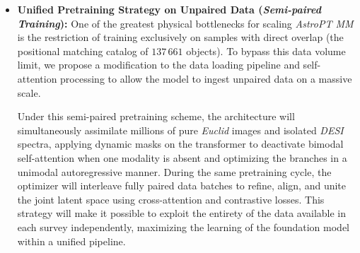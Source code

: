 \begin{itemize}
	\item \textbf{Unified Pretraining Strategy on Unpaired Data (\textit{Semi-paired Training}):} 
	One of the greatest physical bottlenecks for scaling \textit{AstroPT MM} is the restriction of training exclusively on samples with direct overlap (the positional matching catalog of $137\,661$ objects). To bypass this data volume limit, we propose a modification to the data loading pipeline and self-attention processing to allow the model to ingest unpaired data on a massive scale. 

	Under this semi-paired pretraining scheme, the architecture will simultaneously assimilate millions of pure \textit{Euclid} images and isolated \textit{\gls{DESI}} spectra, applying dynamic masks on the transformer to deactivate bimodal self-attention when one modality is absent and optimizing the branches in a unimodal autoregressive manner. During the same pretraining cycle, the optimizer will interleave fully paired data batches to refine, align, and unite the joint latent space using cross-attention and contrastive losses. This strategy will make it possible to exploit the entirety of the data available in each survey independently, maximizing the learning of the foundation model within a unified pipeline.
\end{itemize}